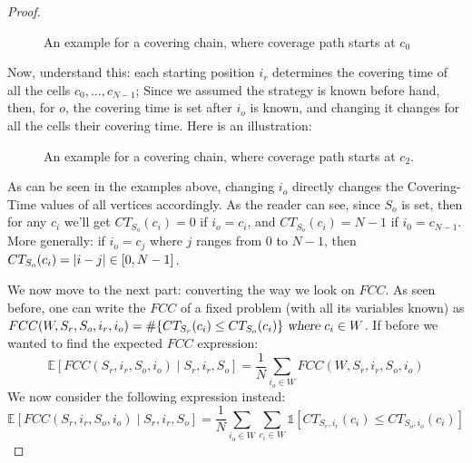 \documentclass[a4paper,10pt]{article}
\newcommand\rob{\ensuremath{r}\xspace}
\newcommand\opp{\ensuremath{o}\xspace}
\newcommand{\fcc}{\ensuremath{FCC}\xspace}
\DeclarePairedDelimiter\abs{\lvert}{\rvert}%
\begin{document}
\begin{proof}
\begin{figure}
\caption{An example for a covering chain, where coverage path starts at $c_0$}
\end{figure}


Now, understand this: each starting position $i_r$ determines the covering time of all the cells $c_0,...,c_{N-1}$; Since we assumed the strategy is known before hand, then, for \opp,  the covering time is set after $i_{\opp}$ is known, and changing it changes for all the cells their covering time. Here is an illustration:

\begin{figure}
\centering
{}

\caption{An example for a covering chain, where coverage path starts at $c_2$.}
\end{figure}
As can be seen in the examples above, changing $i_{\opp}$ directly changes the Covering-Time values of all vertices accordingly.
As the reader can see, since $S_{\opp}$ is set, then for any $c_i$ we'll get $CT_{S_{\opp}}(c_i)=0$ if $i_{\opp}=c_i$, and $CT_{S_{\opp}}(c_i)=N-1$ if $i_0=c_{N-1}$. More generally: if $i_{\opp}=c_j$ where $j$ ranges from $0$ to $N-1$, then $CT_{S_{\opp}}(c_i)=\abs{i-j}\in [0,N-1]$.

We now move to the next part: converting the way we look on \fcc. As seen before, one can write the \fcc of a fixed problem (with all its variables known) as $\fcc(W,S_{\rob},S_{\opp},i_r,i_{\opp})=\# \lbrace CT_{S_{\rob}}(c_i) \le CT_{S_{\opp}}(c_i)\rbrace \textsl{ where } c_i\in W$.
If before we wanted to find the expected \fcc expression: 
\[\mathbb{E}\left[\fcc\left( S_{\rob}, i_r, S_{\opp}, i_{\opp}\right) \mid S_{\rob}, i_r, S_{\opp}\right]=
\frac{1}{N}\sum_{i_{\opp}\in W}{\fcc\left(W,S_{\rob},i_r,S_{\opp},i_{\opp}\right)}\]
We now consider the following expression instead:
\[\mathbb{E}\left[\fcc\left( S_{\rob}, i_r, S_{\opp}, i_{\opp}\right) \mid  S_{\rob}, i_r, S_{\opp}\right]=
\frac{1}{N}\sum_{i_{\opp}\in W}{\sum_{c_i\in W}{\mathds{1}\left[CT_{S_{\rob},i_r}(c_i) \le CT_{S_{\opp},i_{\opp}}(c_i)\right]}}\]


\end{proof}
\end{document}
